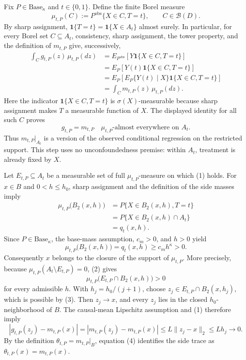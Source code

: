Fix \(P\in\mathrm{Base}_\kappa\) and \(t\in\{0,1\}\).  Define the finite Borel measure
\[
 \mu_{t,P}(C):=P^{\mathrm{obs}}\{X\in C,T=t\},\qquad C\in\mathcal B(D).
\]
By sharp assignment, \(\mathbf 1\{T=t\}=\mathbf 1\{X\in A_t\}\) almost surely.  In particular, for every Borel set \(C\subseteq A_t\), consistency, sharp assignment, the tower property, and the definition of \(m_{t,P}\) give, successively,
\[
\begin{aligned}
 \int_C g_{t,P}(z)\,\mu_{t,P}(dz)
 &=E_{P^{\mathrm{obs}}}\!\left[Y\mathbf 1\{X\in C,T=t\}\right] \\
 &=E_P\!\left[Y(t)\mathbf 1\{X\in C,T=t\}\right] \\
 &=E_P\!\left[E_P\{Y(t)\mid X\}\mathbf 1\{X\in C,T=t\}\right] \\
 &=\int_C m_{t,P}(z)\,\mu_{t,P}(dz).
\end{aligned}
\]
Here the indicator \(\mathbf 1\{X\in C,T=t\}\) is \(\sigma(X)\)-measurable because sharp assignment makes \(T\) a measurable function of \(X\).  The displayed identity for all such \(C\) proves
\[
 g_{t,P}=m_{t,P}\quad \mu_{t,P}\text{-almost everywhere on }A_t.
\tag{1}
\]
Thus \(m_{t,P}|_{A_t}\) is a version of the observed conditional regression on the restricted support.  This step uses no unconfoundedness premise: within \(A_t\), treatment is already fixed by \(X\).

Let \(E_{t,P}\subseteq A_t\) be a measurable set of full \(\mu_{t,P}\)-measure on which (1) holds.  For \(x\in B\) and \(0<h\le h_0\), sharp assignment and the definition of the side masses imply
\[
\begin{aligned}
 \mu_{t,P}\bigl(B_2(x,h)\bigr)
 &=P\{X\in B_2(x,h),T=t\} \\
 &=P\{X\in B_2(x,h)\cap A_t\} \\
 &=q_t(x,h).
\end{aligned}
\]
Since \(P\in\mathrm{Base}_\kappa\), the base-mass assumption, \(c_m>0\), and \(h>0\) yield
\[
 \mu_{t,P}\bigl(B_2(x,h)\bigr)=q_t(x,h)\ge c_m h^\kappa>0.
\tag{2}
\]
Consequently \(x\) belongs to the closure of the support of \(\mu_{t,P}\).  More precisely, because \(\mu_{t,P}(A_t\setminus E_{t,P})=0\), (2) gives
\[
 \mu_{t,P}\bigl(E_{t,P}\cap B_2(x,h)\bigr)>0
\tag{3}
\]
for every admissible \(h\).  With \(h_j=h_0/(j+1)\), choose \(z_j\in E_{t,P}\cap B_2(x,h_j)\), which is possible by (3).  Then \(z_j\to x\), and every \(z_j\) lies in the closed \(h_0\)-neighborhood of \(B\).  The causal-mean Lipschitz assumption and (1) therefore imply
\[
 \left|g_{t,P}(z_j)-m_{t,P}(x)\right|
 =\left|m_{t,P}(z_j)-m_{t,P}(x)\right|
 \le L\lVert z_j-x\rVert_2
 \le Lh_j\longrightarrow0.
\tag{4}
\]
By the definition \(\theta_{t,P}=m_{t,P}|_B\), equation (4) identifies the side trace as \(\theta_{t,P}(x)=m_{t,P}(x)\).

